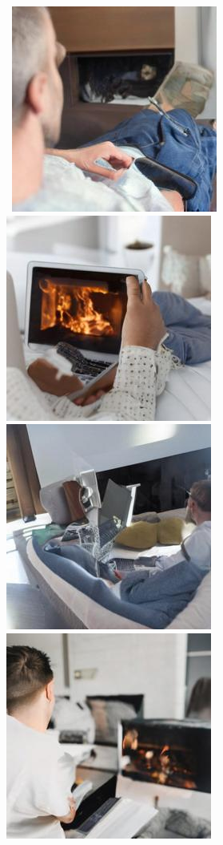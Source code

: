 
\begin{figure}[h!]
    \centering
    \begin{subfigure}[t]{0.49\linewidth}
        \centering
        \,%
        \includegraphics[width=0.24\linewidth]{figs/samples/cfg0.0_prompt_37_image_3.jpg}\,%
        \includegraphics[width=0.24\linewidth]{figs/samples/cfg0.0_prompt_37_image_5.jpg}\,%
        \includegraphics[width=0.24\linewidth]{figs/samples/cfg0.0_prompt_37_image_6.jpg}\,%
        \includegraphics[width=0.24\linewidth]{figs/samples/cfg0.0_prompt_37_image_7.jpg}\\

\end{subfigure}
\end{figure}
